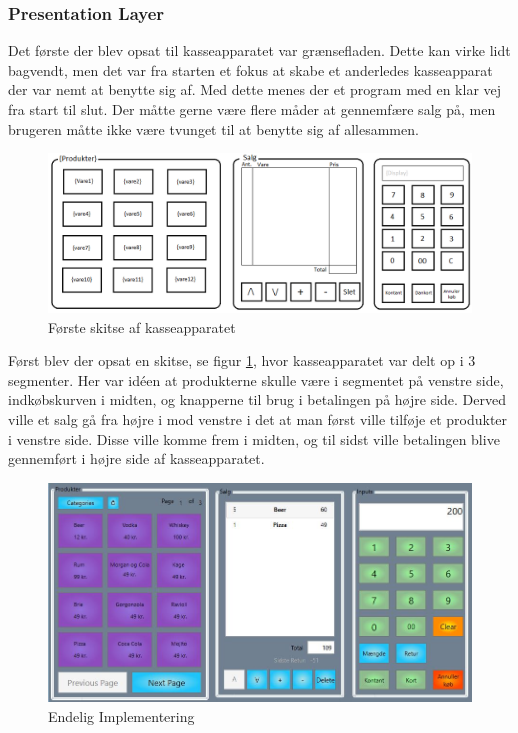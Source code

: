 \subsubsection{Presentation Layer}

Det første der blev opsat til kasseapparatet var grænsefladen. Dette kan virke lidt bagvendt, men det var fra starten et fokus at skabe et anderledes kasseapparat der var nemt at benytte sig af. Med dette menes der et program med en klar vej fra start til slut. Der måtte gerne være flere måder at gennemfære salg på, men brugeren måtte ikke være tvunget til at benytte sig af allesammen.



\begin{figure}[H]
	\centering
	\includegraphics[width=0.9\linewidth]{Projektbeskrivelse/DesignOgImplementering/pics/KasseMockup}
	\caption{Første skitse af kasseapparatet}
	\label{fig:sub1}
\end{figure}%


Først blev der opsat en skitse, se figur \ref*{fig:sub1}, hvor kasseapparatet var delt op i 3 segmenter. Her var idéen at produkterne skulle være i segmentet på venstre side, indkøbskurven i midten, og knapperne til brug i betalingen på højre side. Derved ville et salg gå fra højre i mod venstre i det at man først ville tilføje et produkter i venstre side. Disse ville komme frem i midten, og til sidst ville betalingen blive gennemført i højre side af kasseapparatet. 

\begin{figure}[H]
	\centering
	\includegraphics[width=0.9\linewidth]{Projektbeskrivelse/DesignOgImplementering/pics/GUI}
	\caption{Endelig Implementering}
	\label{fig:sub2}
\end{figure}

